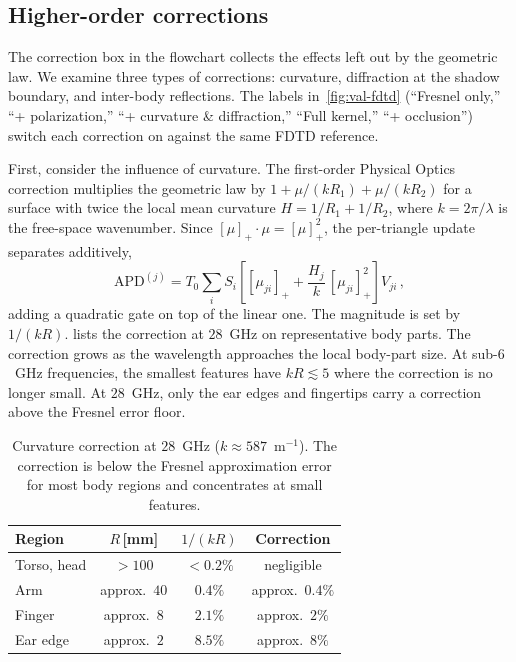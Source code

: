 \documentclass[journal,twocolumn,10pt]{IEEEtran}
\theoremstyle{plain}
\newcommand{\APD}{\mathrm{APD}}
\newcommand{\pospart}[1]{\left[#1\right]_{+}}
\begin{document}
\subsection{Higher-order corrections}\label{subsec:corr-residuals}

The correction box in the flowchart collects the effects left out by
the geometric law. We examine three types of corrections: curvature,
diffraction at the shadow boundary, and inter-body reflections. The
labels in~\cref{fig:val-fdtd} (``Fresnel only,'' ``+ polarization,'' ``+
curvature \& diffraction,'' ``Full kernel,'' ``+ occlusion'') switch
each correction on against the same FDTD reference.

First, consider the influence of curvature. The first-order Physical
Optics correction multiplies the geometric law by
$1 + \mu/(kR_1) + \mu/(kR_2)$ for a surface with twice the local mean
curvature $H = 1/R_1 + 1/R_2$, where $k = 2\pi/\lambda$ is the
free-space wavenumber. Since
$\pospart{\mu}\cdot\mu = \pospart{\mu}^2$, the per-triangle update
separates additively,
\begin{equation}\label{eq:curv-update}
  \APD^{(j)} = T_0 \sum_i S_i\!\left[
  \pospart{\mu_{ji}} + \frac{H_j}{k}\,\pospart{\mu_{ji}}^2 \right]
  V_{ji}\, ,
\end{equation}
adding a quadratic gate on top of the linear one. The magnitude is
set by $1/(kR)$.  lists the correction at
$28$~GHz on representative body parts. The correction grows as the
wavelength approaches the local body-part size. At sub-$6$~GHz
frequencies, the smallest features have $kR \lesssim 5$ where the
correction is no longer small. At $28$~GHz, only the ear edges and
fingertips carry a correction above the Fresnel error floor.

\begin{table}[!t]
\centering
\caption{Curvature correction at $28$~GHz ($k \approx 587$~m$^{-1}$).
The correction is below the Fresnel approximation error for most
body regions and concentrates at small features.}
\label{tab:curv-mag}
\begin{tabular}{lccc}
\toprule
Region & $R$\,[mm] & $1/(kR)$ & Correction \\
\midrule
Torso, head & $> 100$ & $< 0.2\%$ & negligible \\
Arm         & approx.\ $40$ & $0.4\%$ & approx.\ $0.4\%$ \\
Finger      & approx.\ $8$  & $2.1\%$ & approx.\ $2\%$ \\
Ear edge    & approx.\ $2$  & $8.5\%$ & approx.\ $8\%$ \\
\bottomrule
\end{tabular}
\end{table}
\end{document}
